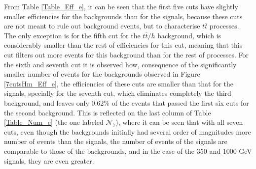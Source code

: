 \begin{table}[ht!]
\centering
\caption{Table of number of events ($\mathcal{N}$) of the seven cuts applied to the events for the $W^{\pm} \rightarrow e, \nu_e$ channel for high $Z^{\prime}$ masses.}
\label{Table_Num_e}
\end{table}

From Table \ref{Table_Eff_e}, it can be seen that the first five cuts have slightly smaller efficiencies for the backgrounds than for the signals, because these cuts are not meant to rule out background events, but to characterise $t\overline t$ processes. The only exception is for the fifth cut for the $t\overline t/h$ background, which is considerably smaller than the rest of efficiencies for this cut, meaning that this cut filters out more events for this background than for the rest of processes. For the sixth and seventh cut it is observed how, consequence of the significantly smaller number of events for the backgrounds observed in Figure \ref{7cutsHm_Eff_e}, the efficiencies of these cuts are smaller than that for the signals, specially for the seventh cut, which eliminates completely the third background, and leaves only 0.62\% of the events that passed the first six cuts for the second background. This is reflected on the last column of Table \ref{Table_Num_e} (the one labeled $\mathcal{N}_7$), where it can be seen that with all seven cuts, even though the backgrounds initially had several order of magnitudes more number of events than the signals, the number of events of the signals are comparable to those of the backgrounds, and in the case of the 350 and 1000 GeV signals, they are even greater.

